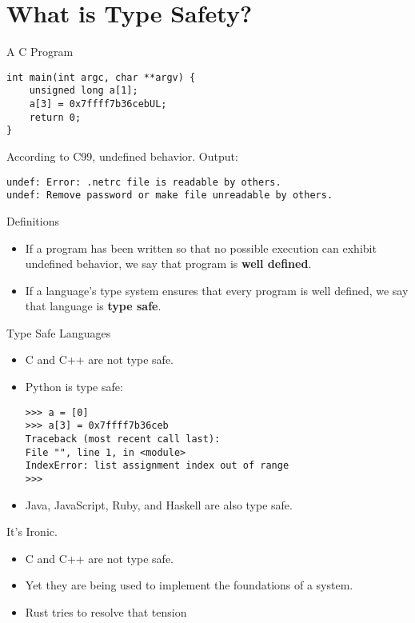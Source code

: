\section{What is Type Safety?}


\begin{frame}[fragile]{A C Program}
\begin{verbatim}
int main(int argc, char **argv) {
    unsigned long a[1];
    a[3] = 0x7ffff7b36cebUL;
    return 0;
}
\end{verbatim}
	According to C99, undefined behavior. Output:

	{\footnotesize \tt undef: Error: .netrc file is readable by others.\\
	undef: Remove password or make file unreadable by others.}
\end{frame}


\begin{frame}{Definitions}
	\begin{itemize}
		\item If a program has been written so that no possible execution can
			exhibit undefined behavior, we say that program is \textbf{well defined}.
		\item If a language’s type system ensures that every program is well
			defined, we say that language is \textbf{type safe}.
	\end{itemize}
\end{frame}


\begin{frame}[fragile]{Type Safe Languages}
	\begin{itemize}
		\item C and C++ are not type safe.
		\item Python is type safe:
\begin{verbatim}
>>> a = [0]
>>> a[3] = 0x7ffff7b36ceb
Traceback (most recent call last):
File "", line 1, in <module>
IndexError: list assignment index out of range
>>>
\end{verbatim}
		\item Java, JavaScript, Ruby, and Haskell are also type safe.
	\end{itemize}
\end{frame}


\begin{frame}{It's Ironic.}
	\begin{itemize}
		\item C and C++ are not type safe.
		\item Yet they are being used to implement the foundations of a system.
		\item Rust tries to resolve that tension
	\end{itemize}
\end{frame}

